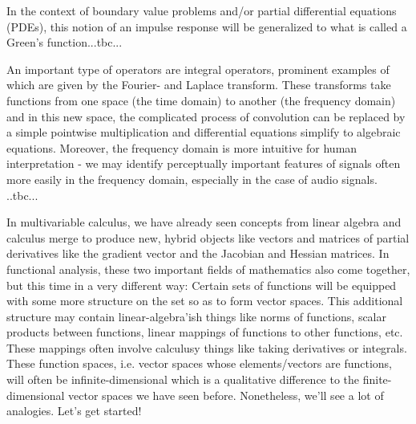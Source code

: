 \medskip
In the context of boundary value problems and/or partial differential equations (PDEs), this notion of an impulse response will be generalized to what is called a Green's function...tbc...

\medskip
An important type of operators are integral operators, prominent examples of which are given by the Fourier- and Laplace transform. These transforms take functions from one space (the time domain) to another (the frequency domain) and in this new space, the complicated process of convolution can be replaced by a simple pointwise multiplication and differential equations simplify to algebraic equations. Moreover, the frequency domain is more intuitive for human interpretation - we may identify perceptually important features of signals often more easily in the frequency domain, especially in the case of audio signals.
..tbc...

\medskip
In multivariable calculus, we have already seen concepts from linear algebra and calculus merge to produce new, hybrid objects like vectors and matrices of partial derivatives like the gradient vector and the Jacobian and Hessian matrices. In functional analysis, these two important fields of mathematics also come together, but this time in a very different way: Certain sets of functions will be equipped with some more structure on the set so as to form vector spaces. This additional structure may contain linear-algebra'ish things like norms of functions, scalar products between functions, linear mappings of functions to other functions, etc. These mappings often involve calculusy things like taking derivatives or integrals. These function spaces, i.e. vector spaces whose elements/vectors are functions, will often be infinite-dimensional which is a qualitative difference to the finite-dimensional vector spaces we have seen before. Nonetheless, we'll see a lot of analogies. Let's get started!





